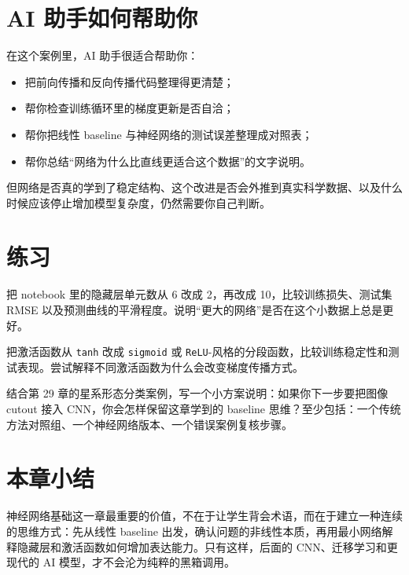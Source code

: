 \section{AI 助手如何帮助你}

在这个案例里，AI 助手很适合帮助你：

\begin{itemize}
    \item 把前向传播和反向传播代码整理得更清楚；
    \item 帮你检查训练循环里的梯度更新是否自洽；
    \item 帮你把线性 baseline 与神经网络的测试误差整理成对照表；
    \item 帮你总结“网络为什么比直线更适合这个数据”的文字说明。
\end{itemize}

但网络是否真的学到了稳定结构、这个改进是否会外推到真实科学数据、以及什么时候应该停止增加模型复杂度，仍然需要你自己判断。

\section{练习}

\begin{exercisebox}[基础练习]
把 notebook 里的隐藏层单元数从 6 改成 2，再改成 10，比较训练损失、测试集 RMSE 以及预测曲线的平滑程度。说明“更大的网络”是否在这个小数据上总是更好。
\end{exercisebox}

\begin{exercisebox}[进阶练习]
把激活函数从 \texttt{tanh} 改成 \texttt{sigmoid} 或 \texttt{ReLU}-风格的分段函数，比较训练稳定性和测试表现。尝试解释不同激活函数为什么会改变梯度传播方式。
\end{exercisebox}

\begin{exercisebox}[开放练习]
结合第 29 章的星系形态分类案例，写一个小方案说明：如果你下一步要把图像 cutout 接入 CNN，你会怎样保留这章学到的 baseline 思维？至少包括：一个传统方法对照组、一个神经网络版本、一个错误案例复核步骤。
\end{exercisebox}

\section{本章小结}

神经网络基础这一章最重要的价值，不在于让学生背会术语，而在于建立一种连续的思维方式：先从线性 baseline 出发，确认问题的非线性本质，再用最小网络解释隐藏层和激活函数如何增加表达能力。只有这样，后面的 CNN、迁移学习和更现代的 AI 模型，才不会沦为纯粹的黑箱调用。
